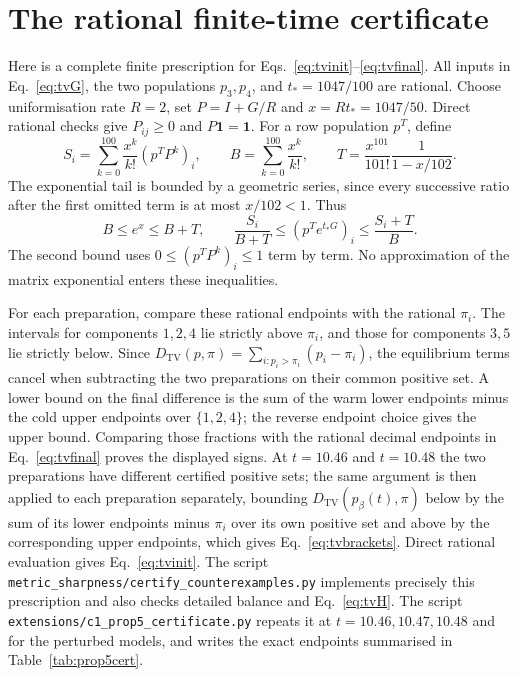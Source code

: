 \documentclass[11pt,a4paper]{article}
\theoremstyle{remark}\newtheorem{remark}[theorem]{Remark}
\newcommand{\one}{\mathbf 1}
\newcommand{\TV}{D_{\mathrm{TV}}}
\begin{document}
\section{The rational finite-time certificate}\label{app:certificate}
Here is a complete finite prescription for Eqs.~\eqref{eq:tvinit}--\eqref{eq:tvfinal}. All inputs in Eq.~\eqref{eq:tvG}, the two populations $p_3,p_4$, and $t_*=1047/100$ are rational. Choose uniformisation rate $R=2$, set $P=I+G/R$ and $x=Rt_*=1047/50$. Direct rational checks give $P_{ij}\ge0$ and $P\one=\one$. For a row population $p^T$, define
\begin{equation}
 S_i=\sum_{k=0}^{100}\frac{x^k}{k!}(p^TP^k)_i,\qquad
 B=\sum_{k=0}^{100}\frac{x^k}{k!},\qquad
 T=\frac{x^{101}}{101!}\frac1{1-x/102}.
 \label{eq:certificate}
\end{equation}
The exponential tail is bounded by a geometric series, since every successive ratio after the first omitted term is at most $x/102<1$. Thus
\begin{equation}
 B\le e^x\le B+T,\qquad
 \frac{S_i}{B+T}\le(p^Te^{t_*G})_i\le\frac{S_i+T}{B}.
 \label{eq:interval}
\end{equation}
The second bound uses $0\le(p^TP^k)_i\le1$ term by term. No approximation of the matrix exponential enters these inequalities.

For each preparation, compare these rational endpoints with the rational $\pi_i$. The intervals for components $1,2,4$ lie strictly above $\pi_i$, and those for components $3,5$ lie strictly below. Since $\TV(p,\pi)=\sum_{i:p_i>\pi_i}(p_i-\pi_i)$, the equilibrium terms cancel when subtracting the two preparations on their common positive set. A lower bound on the final difference is the sum of the warm lower endpoints minus the cold upper endpoints over $\{1,2,4\}$; the reverse endpoint choice gives the upper bound. Comparing those fractions with the rational decimal endpoints in Eq.~\eqref{eq:tvfinal} proves the displayed signs. At $t=10.46$ and $t=10.48$ the two preparations have different certified positive sets; the same argument is then applied to each preparation separately, bounding $\TV(p_\beta(t),\pi)$ below by the sum of its lower endpoints minus $\pi_i$ over its own positive set and above by the corresponding upper endpoints, which gives Eq.~\eqref{eq:tvbrackets}. Direct rational evaluation gives Eq.~\eqref{eq:tvinit}. The script \texttt{metric\_sharpness/certify\_counterexamples.py} implements precisely this prescription and also checks detailed balance and Eq.~\eqref{eq:tvH}. The script \texttt{extensions/c1\_prop5\_certificate.py} repeats it at $t=10.46,10.47,10.48$ and for the perturbed models, and writes the exact endpoints summarised in Table~\ref{tab:prop5cert}.
\end{document}
